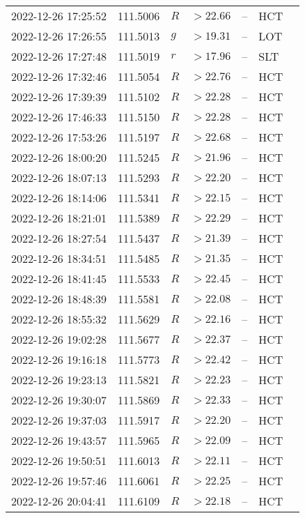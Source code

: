 \documentclass{nature_plusfigure}
\begin{document}
\begin{supplement}
\begin{center}
\begin{longtable}{lllllll}
2022-12-26 17:25:52 & 111.5006 & $R$ & $>22.66$ & -- & HCT &  \\ 
2022-12-26 17:26:55 & 111.5013 & $g$ & $>19.31$ & -- & LOT &  \\ 
2022-12-26 17:27:48 & 111.5019 & $r$ & $>17.96$ & -- & SLT &  \\ 
2022-12-26 17:32:46 & 111.5054 & $R$ & $>22.76$ & -- & HCT &  \\ 
2022-12-26 17:39:39 & 111.5102 & $R$ & $>22.28$ & -- & HCT &  \\ 
2022-12-26 17:46:33 & 111.5150 & $R$ & $>22.28$ & -- & HCT &  \\ 
2022-12-26 17:53:26 & 111.5197 & $R$ & $>22.68$ & -- & HCT &  \\ 
2022-12-26 18:00:20 & 111.5245 & $R$ & $>21.96$ & -- & HCT &  \\ 
2022-12-26 18:07:13 & 111.5293 & $R$ & $>22.20$ & -- & HCT &  \\ 
2022-12-26 18:14:06 & 111.5341 & $R$ & $>22.15$ & -- & HCT &  \\ 
2022-12-26 18:21:01 & 111.5389 & $R$ & $>22.29$ & -- & HCT &  \\ 
2022-12-26 18:27:54 & 111.5437 & $R$ & $>21.39$ & -- & HCT &  \\ 
2022-12-26 18:34:51 & 111.5485 & $R$ & $>21.35$ & -- & HCT &  \\ 
2022-12-26 18:41:45 & 111.5533 & $R$ & $>22.45$ & -- & HCT &  \\ 
2022-12-26 18:48:39 & 111.5581 & $R$ & $>22.08$ & -- & HCT &  \\ 
2022-12-26 18:55:32 & 111.5629 & $R$ & $>22.16$ & -- & HCT &  \\ 
2022-12-26 19:02:28 & 111.5677 & $R$ & $>22.37$ & -- & HCT &  \\ 
2022-12-26 19:16:18 & 111.5773 & $R$ & $>22.42$ & -- & HCT &  \\ 
2022-12-26 19:23:13 & 111.5821 & $R$ & $>22.23$ & -- & HCT &  \\ 
2022-12-26 19:30:07 & 111.5869 & $R$ & $>22.33$ & -- & HCT &  \\ 
2022-12-26 19:37:03 & 111.5917 & $R$ & $>22.20$ & -- & HCT &  \\ 
2022-12-26 19:43:57 & 111.5965 & $R$ & $>22.09$ & -- & HCT &  \\ 
2022-12-26 19:50:51 & 111.6013 & $R$ & $>22.11$ & -- & HCT &  \\ 
2022-12-26 19:57:46 & 111.6061 & $R$ & $>22.25$ & -- & HCT &  \\ 
2022-12-26 20:04:41 & 111.6109 & $R$ & $>22.18$ & -- & HCT &  \\ 

\end{longtable}
\end{center}
\end{supplement}
\end{document}
